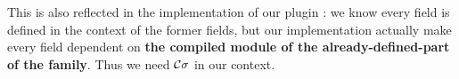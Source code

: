 This is also reflected in the implementation of our plugin : we know every field is defined in the context of the former fields, but our implementation actually make every field dependent on \textbf{the compiled module of the already-defined-part of the family}. Thus we need ${\mathcal{C}}\sigma$ in our context.

